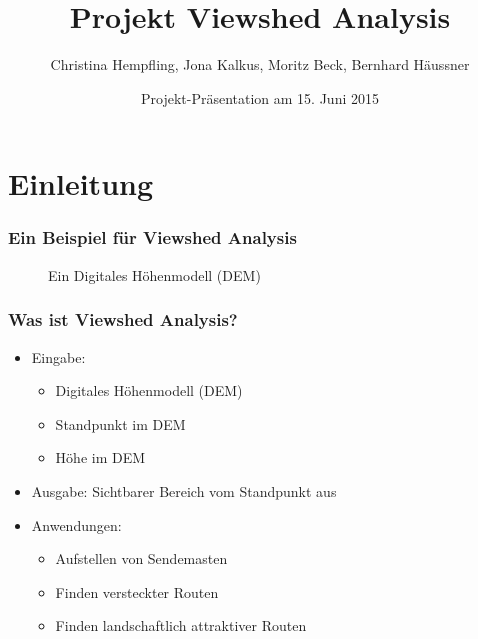 \documentclass{beamer}
\begin{document}
\subject{Algorithmen für geographische Informationssysteme}
\title{Projekt Viewshed Analysis}
\author{Christina Hempfling, Jona Kalkus, Moritz Beck, Bernhard Häussner}
\date{Projekt-Präsentation am 15. Juni 2015}
\maketitle


\section{Einleitung}

\begin{frame}
  \frametitle{Ein Beispiel für Viewshed Analysis}
  \begin{figure}[h]
    \centering
    \caption{Ein Digitales Höhenmodell (DEM) }
    \label{fig:example}
  \end{figure}
\end{frame}

\begin{frame}
  \frametitle{Was ist Viewshed Analysis?}
  \begin{itemize}[<+->]
    \item Eingabe:
    \begin{itemize}
      \item Digitales Höhenmodell (DEM)
      \item Standpunkt im DEM
      \item Höhe im DEM
    \end{itemize}
    \item Ausgabe: Sichtbarer Bereich vom Standpunkt aus
    \item Anwendungen: 
    \begin{itemize}
      \item Aufstellen von Sendemasten
      \item Finden versteckter Routen
      \item Finden landschaftlich attraktiver Routen
    \end{itemize}
  \end{itemize}
\end{frame}
\end{document}
